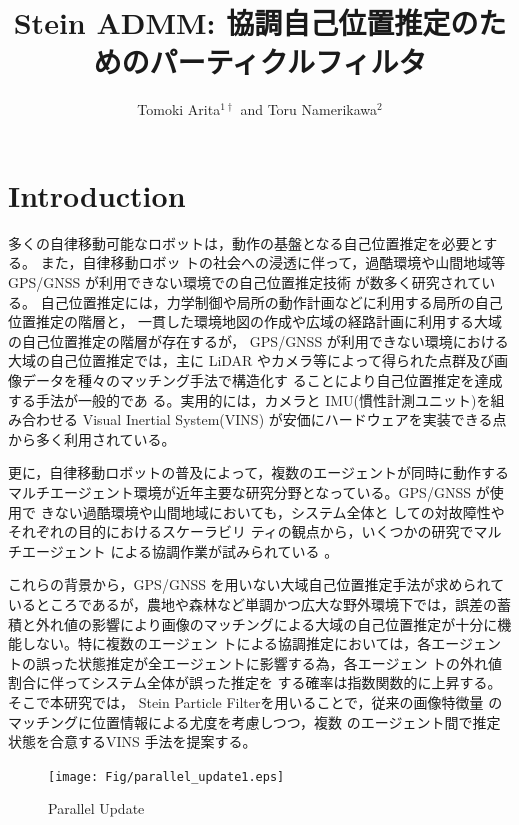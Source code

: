 \documentclass[a4paper,fleqn,10pt,twocolumn]{SICE_ISCS}
\title{Stein ADMM: 協調自己位置推定のためのパーティクルフィルタ}
\author{Tomoki Arita${}^{1\dagger}$ and Toru Namerikawa${}^{2}$}
\begin{document}
\maketitle


\section{Introduction}
多くの自律移動可能なロボットは，動作の基盤となる自己位置推定を必要とする。
また，自律移動ロボッ トの社会への浸透に伴って，過酷環境や山間地域等 GPS/GNSS が利用できない環境での自己位置推定技術 が数多く研究されている。
自己位置推定には，力学制御や局所の動作計画などに利用する局所の自己位置推定の階層と，
一貫した環境地図の作成や広域の経路計画に利用する大域の自己位置推定の階層が存在するが， 
GPS/GNSS が利用できない環境における大域の自己位置推定では，主に LiDAR やカメラ等によって得られた点群及び画像データを種々のマッチング手法で構造化す ることにより自己位置推定を達成する手法が一般的であ る。実用的には，カメラと IMU(慣性計測ユニット)を組 み合わせる Visual Inertial System(VINS) が安価にハードウェアを実装できる点から多く利用されている。

更に，自律移動ロボットの普及によって，複数のエージェントが同時に動作するマルチエージェント環境が近年主要な研究分野となっている。GPS/GNSS が使用で きない過酷環境や山間地域においても，システム全体と しての対故障性やそれぞれの目的におけるスケーラビリ ティの観点から，いくつかの研究でマルチエージェント による協調作業が試みられている 。

これらの背景から，GPS/GNSS を用いない大域自己位置推定手法が求められているところであるが，農地や森林など単調かつ広大な野外環境下では，誤差の蓄積と外れ値の影響により画像のマッチングによる大域の自己位置推定が十分に機能しない。特に複数のエージェン トによる協調推定においては，各エージェントの誤った状態推定が全エージェントに影響する為，各エージェン トの外れ値割合に伴ってシステム全体が誤った推定を する確率は指数関数的に上昇する。そこで本研究では， Stein Particle Filterを用いることで，従来の画像特徴量 のマッチングに位置情報による尤度を考慮しつつ，複数 のエージェント間で推定状態を合意するVINS 手法を提案する。
\begin{figure}[t]
	\begin{center}
		\texttt{[image: Fig/parallel\_update1.eps]}
		\caption{Parallel Update}
		\label{fig:parallel_update}
	\end{center}
	\vspace{-2mm}
\end{figure}
\end{document}
